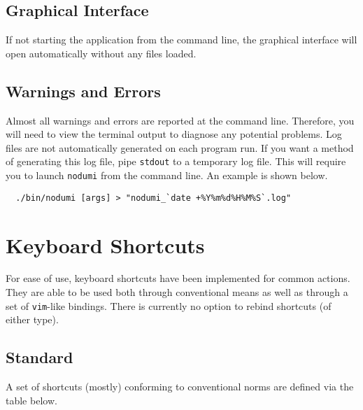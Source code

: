 \documentclass[english]{article}
\providecommand{\mi}[1]{\texttt{#1}}
\begin{document}
\subsection{Graphical Interface}

If not starting the application from the command line, the graphical interface will open automatically without any files loaded.

\subsection{Warnings and Errors}

Almost all warnings and errors are reported at the command line. Therefore, you will need to view the terminal output to
diagnose any potential problems. Log files are not automatically generated on each program run. If you want a method of
generating this log file, pipe \mi{stdout} to a temporary log file. This will require you to launch \mi{nodumi} from the command
line. An example is shown below.

\begin{verbatim}
  ./bin/nodumi [args] > "nodumi_`date +%Y%m%d%H%M%S`.log"
\end{verbatim}

\newpage
\section{Keyboard Shortcuts}

For ease of use, keyboard shortcuts have been implemented for common actions. They are able to be used both through conventional
means as well as through a set of \mi{vim}-like bindings. There is currently no option to rebind shortcuts (of either type).

\subsection{Standard}
\label{subsec:kbshortcut}

A set of shortcuts (mostly) conforming to conventional norms are defined via the table below.

\vspace{1em}
\end{document}
